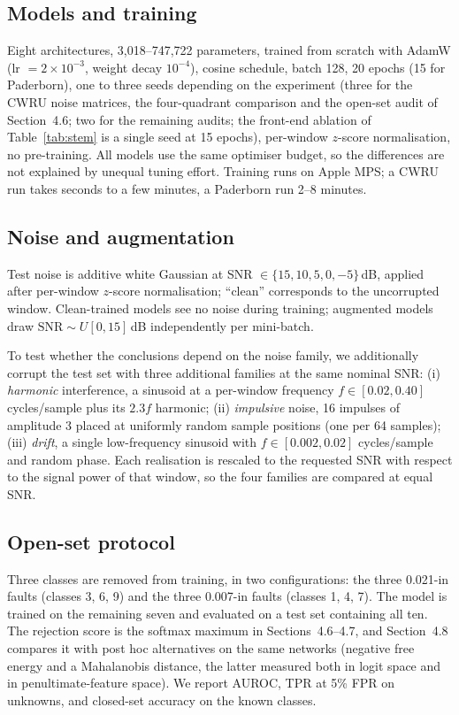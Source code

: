 \documentclass[11pt,a4paper]{article}
\begin{document}
\subsection{Models and training}
Eight architectures, 3{,}018--747{,}722 parameters, trained from scratch with AdamW (lr $=2\times10^{-3}$, weight decay $10^{-4}$), cosine schedule, batch 128, 20 epochs (15 for Paderborn), one to three seeds depending on the experiment (three for the CWRU noise matrices, the four-quadrant comparison and the open-set audit of Section~4.6; two for the remaining audits; the front-end ablation of Table~\ref{tab:stem} is a single seed at 15 epochs), per-window $z$-score normalisation, no pre-training. All models use the same optimiser budget, so the differences are not explained by unequal tuning effort. Training runs on Apple MPS; a CWRU run takes seconds to a few minutes, a Paderborn run 2--8 minutes.

\subsection{Noise and augmentation}
Test noise is additive white Gaussian at SNR $\in\{15,10,5,0,-5\}$\,dB, applied after per-window $z$-score normalisation; “clean” corresponds to the uncorrupted window. Clean-trained models see no noise during training; augmented models draw $\mathrm{SNR}\sim U[0,15]$\,dB independently per mini-batch.

To test whether the conclusions depend on the noise family, we additionally corrupt the test set with three additional families at the same nominal SNR: (i) \emph{harmonic} interference, a sinusoid at a per-window frequency $f\in[0.02,0.40]$ cycles/sample plus its $2.3f$ harmonic; (ii) \emph{impulsive} noise, 16 impulses of amplitude 3 placed at uniformly random sample positions (one per 64 samples); (iii) \emph{drift}, a single low-frequency sinusoid with $f\in[0.002,0.02]$ cycles/sample and random phase. Each realisation is rescaled to the requested SNR with respect to the signal power of that window, so the four families are compared at equal SNR.

\subsection{Open-set protocol}
Three classes are removed from training, in two configurations: the three 0.021-in faults (classes 3, 6, 9) and the three 0.007-in faults (classes 1, 4, 7). The model is trained on the remaining seven and evaluated on a test set containing all ten. The rejection score is the softmax maximum in Sections~4.6--4.7, and Section~4.8 compares it with post hoc alternatives on the same networks (negative free energy and a Mahalanobis distance, the latter measured both in logit space and in penultimate-feature space). We report AUROC, TPR at 5\% FPR on unknowns, and closed-set accuracy on the known classes.
\end{document}

